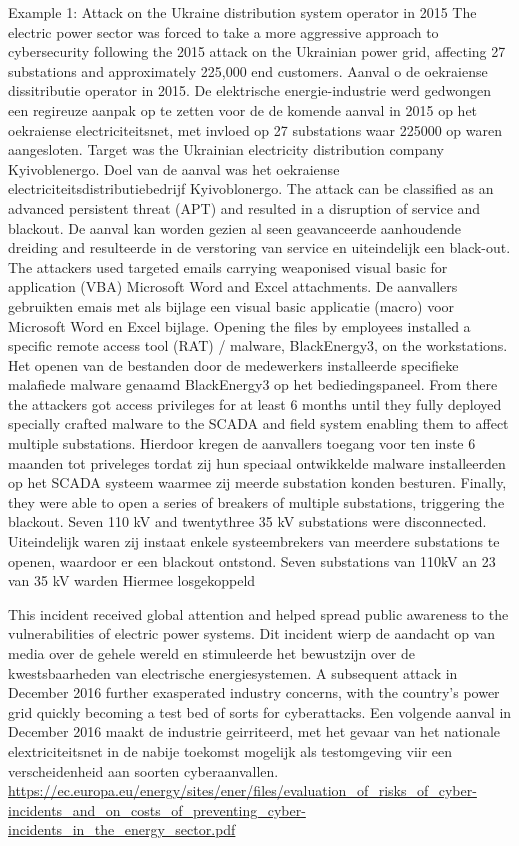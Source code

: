 		Example 1: Attack on the Ukraine distribution system operator in 2015 The electric power sector was
		forced to take a more aggressive approach to cybersecurity following the 2015 attack on the
		Ukrainian power grid, affecting 27 substations and approximately 225,000 end customers. Aanval o
		de oekraiense dissitributie operator in 2015. De elektrische energie-industrie werd gedwongen een
		regireuze aanpak op te zetten voor de de komende aanval in 2015 op het oekraiense electriciteitsnet,
		met invloed op 27 substations waar 225000 op waren aangesloten.
		Target was the Ukrainian electricity distribution company Kyivoblenergo. Doel van de aanval was het
		oekraiense electriciteitsdistributiebedrijf Kyivoblonergo.
		The attack can be classified as an advanced persistent threat (APT) and resulted in a disruption of
		service and blackout. De aanval kan worden gezien al seen geavanceerde aanhoudende dreiding and
		resulteerde in de verstoring van service en uiteindelijk een black-out.
		The attackers used targeted emails carrying weaponised visual basic for application (VBA) Microsoft
		Word and Excel attachments. De aanvallers gebruikten emais met als bijlage een visual basic
		applicatie (macro) voor Microsoft Word en Excel bijlage.
		Opening the files by employees installed a specific remote access tool (RAT) / malware,
		BlackEnergy3, on the workstations. Het openen van de bestanden door de medewerkers installeerde
		specifieke malafiede malware genaamd BlackEnergy3 op het bediedingspaneel.
		From there the attackers got access privileges for at least 6 months until they fully deployed specially
		crafted malware to the SCADA and field system enabling them to affect multiple substations.
		Hierdoor kregen de aanvallers toegang voor ten inste 6 maanden tot priveleges tordat zij hun
		speciaal ontwikkelde malware installeerden op het SCADA systeem waarmee zij meerde substation
		konden besturen.
		Finally, they were able to open a series of breakers of multiple substations, triggering the blackout.
		Seven 110 kV and twentythree 35 kV substations were disconnected. Uiteindelijk waren zij instaat
		enkele systeembrekers van meerdere substations te openen, waardoor er een blackout ontstond.
		Seven substations van 110kV an 23 van 35 kV warden Hiermee losgekoppeld
		
		This incident received global attention and helped spread public awareness to the vulnerabilities of
		electric power systems. Dit incident wierp de aandacht op van media over de gehele wereld en
		stimuleerde het bewustzijn over de kwestsbaarheden van electrische energiesystemen.
		A subsequent attack in December 2016 further exasperated industry concerns, with the country’s
		power grid quickly becoming a test bed of sorts for cyberattacks. Een volgende aanval in December
		2016 maakt de industrie geirriteerd, met het gevaar van het nationale elextriciteitsnet in de nabije
		toekomst mogelijk als testomgeving viir een verscheidenheid aan soorten cyberaanvallen.
		\url{https://ec.europa.eu/energy/sites/ener/files/evaluation_of_risks_of_cyber-
			incidents_and_on_costs_of_preventing_cyber-incidents_in_the_energy_sector.pdf}
		
